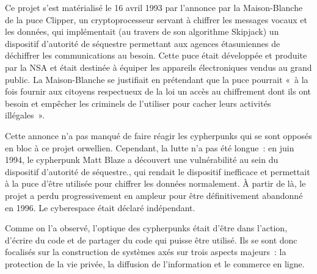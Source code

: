 Ce projet s'est matérialisé le 16 avril 1993 par l'annonce par la Maison-Blanche de la puce Clipper, un cryptoprocesseur servant à chiffrer les messages vocaux et les données, qui implémentait (au travers de son algorithme Skipjack) un dispositif d'autorité de séquestre permettant aux agences étasuniennes de déchiffrer les communications au besoin. Cette puce était développée et produite par la NSA et était destinée à équiper les appareils électroniques vendus au grand public. La Maison-Blanche se justifiait en prétendant que la puce pourrait «~à la fois fournir aux citoyens respectueux de la loi un accès au chiffrement dont ils ont besoin et empêcher les criminels de l'utiliser pour cacher leurs activités illégales~».

Cette annonce n'a pas manqué de faire réagir les cypherpunks qui se sont opposés en bloc à ce projet orwellien. Cependant, la lutte n'a pas été longue~: en juin 1994, le cypherpunk Matt Blaze a découvert une vulnérabilité au sein du dispositif d'autorité de séquestre., qui rendait le dispositif inefficace et permettait à la puce d'être utilisée pour chiffrer les données normalement. À partir de là, le projet a perdu progressivement en ampleur pour être définitivement abandonné en 1996. Le cyberespace était déclaré indépendant.


Comme on l'a observé, l'optique des cypherpunks était d'être dans l'action, d'écrire du code et de partager du code qui puisse être utilisé. Ils se sont donc focalisés sur la construction de systèmes axés sur trois aspects majeurs~: la protection de la vie privée, la diffusion de l'information et le commerce en ligne. %


